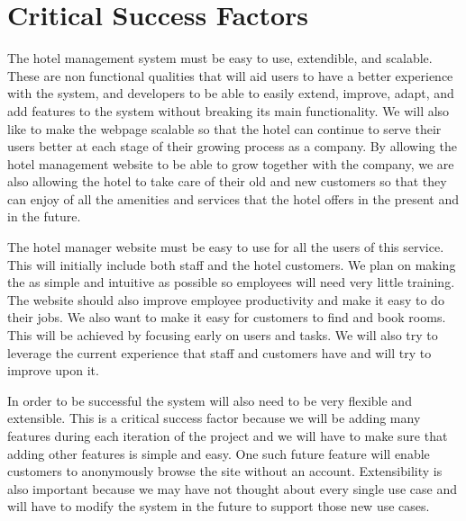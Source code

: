 \section{Critical Success Factors}
The hotel management system must be easy to use, extendible, and scalable. These are non functional qualities that will aid users to have a better experience with the system, and developers to be able to easily extend, improve, adapt, and add features to the system without breaking its main functionality. We will also like to make the webpage scalable so that the hotel can continue to serve their users better at each stage of their growing process as a company. By allowing the hotel management website to be able to grow together with the company, we are also allowing the hotel to take care of their old and new customers so that they can enjoy of all the amenities and services that the hotel offers in the present and in the future.

The hotel manager website must be easy to use for all the users of this service. This will initially include both staff and the hotel customers. We plan on making the as simple and intuitive as possible so employees will need very little training. The website should also improve employee productivity and make it easy to do their jobs. We also want to make it easy for customers to find and book rooms. This will be achieved by focusing early on users and tasks. We will also try to leverage the current experience that staff and customers have and will try to improve upon it.

In order to be successful the system will also need to be very flexible and extensible. This is a critical success factor because we will be adding many features during each iteration of the project and we will have to make sure that adding other features is simple and easy. One such future feature will enable customers to anonymously browse the site without an account. Extensibility is also important because we may have not thought about every single use case and will have to modify the system in the future to support those new use cases. 
